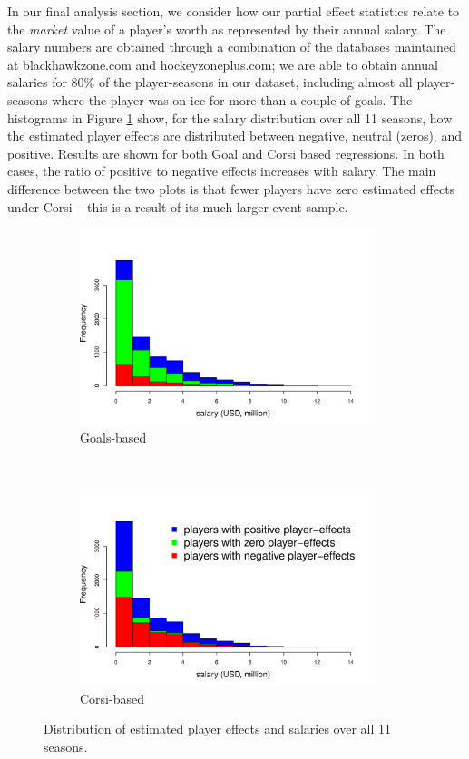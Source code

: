 In our final analysis section, we consider how our partial effect statistics
relate to the \textit{market} value of a player's worth as represented by
their annual salary.  The salary numbers are obtained through a combination of
the databases maintained at {\sf blackhawkzone.com} and {\sf
hockeyzoneplus.com}; we are able to obtain annual salaries for 80\%
of the player-seasons in our dataset, including almost all player-seasons
where the player was on ice for more than a couple of goals. The histograms in
Figure \ref{fig:salhist} show, for the salary distribution over all 11
seasons, how the estimated player effects are distributed between negative,
neutral (zeros), and positive.  Results are shown for both Goal and Corsi
based regressions.  In both cases, the ratio of positive to negative effects
increases with salary.  The main difference between the two plots is that
fewer players have zero estimated effects under Corsi -- this is a result of
its much larger event sample.



\begin{figure}[t]
    \centering
    \begin{subfigure}[t]{0.5\textwidth}
        \centering
        \includegraphics[height=2.25in]{figures/salaryhist-goals-regular.pdf}
        \caption{Goals-based}
    \end{subfigure}%
    ~ 
    \begin{subfigure}[t]{0.5\textwidth}
        \centering
        \includegraphics[height=2.25in]{figures/salaryhist-corsi-regular.pdf}
        \caption{Corsi-based}
    \end{subfigure}
    \caption{ \label{fig:salhist} Distribution of estimated player effects and salaries over all 11 seasons.}
\end{figure}


